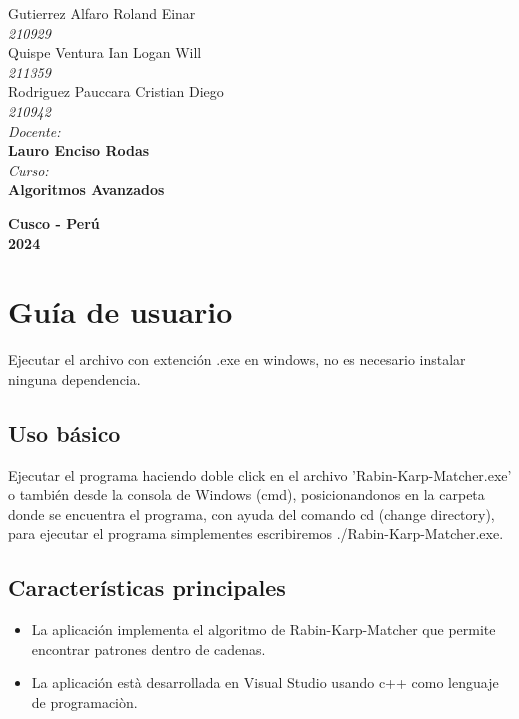 \documentclass[a4paper]{article}
\begin{document}
\begin{titlepage}
    {\large Gutierrez Alfaro Roland Einar}\\
    \textit{210929}\\[0.1cm]

    {\large Quispe Ventura Ian Logan Will}\\
    \textit{211359}\\[0.1cm]

    {\large Rodriguez Pauccara Cristian Diego }\\
    \textit{210942}\\[0.1cm]

\vspace{0.1cm}
    \textit{\Large Docente:}\\
    \textbf{\large Lauro Enciso Rodas}\\
\vspace{0.5cm}
    \textit{\Large Curso:}\\
    \textbf{\large Algoritmos Avanzados}\\
    \vfill

\vspace{0.5cm}
\textbf{\Large Cusco - Perú }\\
    \textbf{\large 2024}\\
    \newpage
    \end{titlepage}

\restoregeometry
\newpage
\section{Guía de usuario}
Ejecutar el archivo con extención .exe en windows, no es necesario instalar ninguna dependencia.

\subsection{Uso básico}
Ejecutar el programa haciendo doble click en el archivo 'Rabin-Karp-Matcher.exe' o también desde la consola de Windows (cmd), posicionandonos en la carpeta donde se encuentra el programa, con ayuda del comando cd (change directory), para ejecutar el programa simplementes escribiremos ./Rabin-Karp-Matcher.exe.

\subsection{Características principales}
\begin{itemize}
    \item La aplicación implementa el algoritmo de Rabin-Karp-Matcher que permite encontrar patrones dentro de cadenas. 
    \item La aplicación està desarrollada en Visual Studio usando c++ como lenguaje de programaciòn. 
\end{itemize}
\end{document}
